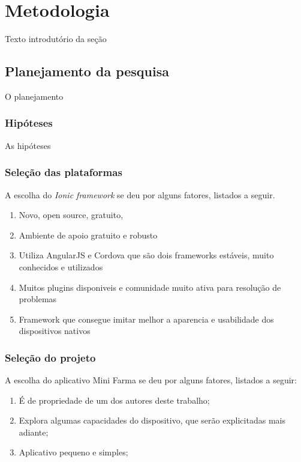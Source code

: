 \chapter{Metodologia} \label{metodologia}

Texto introdutório da seção

\section{Planejamento da pesquisa} \label{sec:planejamento}

O planejamento

\subsection{Hipóteses} \label{subsec:hipoteses}

As hipóteses

\subsection{Seleção das plataformas} \label{subsec:selecaodasplataformas}

A escolha do \textit{Ionic framework} se deu por alguns fatores, listados a seguir. 
\begin{enumerate}
    \item Novo, open source, gratuito,
    \item Ambiente de apoio gratuito e robusto
    \item Utiliza AngularJS e Cordova que são dois frameworks estáveis, muito conhecidos e utilizados
    \item Muitos plugins disponiveis e comunidade muito ativa para resolução de problemas %
    \item Framework que consegue imitar melhor a aparencia e usabilidade dos dispositivos nativos %
\end{enumerate}
 
\begin{comment}
Porque Ionic? Porque não, outro? Quais os criterios usados para escolher o Ionic?
Ionic é open source, gratuito, muito focado em performance e possui html e css otimizados para dispositivos móveis.
\end{comment}

\subsection{Seleção do projeto} \label{subsec:selecaodoprojeto}

A escolha do aplicativo Mini Farma se deu por alguns fatores, listados a seguir:

\begin{enumerate}
    \item É de propriedade de um dos autores deste trabalho;
    \item Explora algumas capacidades do dispositivo, que serão explicitadas mais adiante;
    \item Aplicativo pequeno e simples;
\end{enumerate}
 